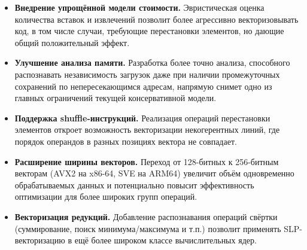 \begin{itemize}
    \item \textbf{Внедрение упрощённой модели стоимости.}
    Эвристическая оценка количества вставок и извлечений позволит более агрессивно векторизовывать код, 
    в том числе случаи, требующие перестановки элементов, но дающие общий положительный эффект.

    \item \textbf{Улучшение анализа памяти.}
    Разработка более точно анализа, способного распознавать независимость загрузок 
    даже при наличии промежуточных сохранений по непересекающимся адресам, 
    напрямую снимет одно из главных ограничений текущей консервативной модели.

    \item \textbf{Поддержка shuffle-инструкций.}
    Реализация операций перестановки элементов откроет возможность векторизации некогерентных линий, 
    где порядок операндов в разных позициях вектора не совпадает.

    \item \textbf{Расширение ширины векторов.}
    Переход от 128-битных к 256-битным векторам (AVX2 на x86-64, SVE на ARM64) увеличит
    объём одновременно обрабатываемых данных и потенциально повысит эффективность оптимизации для более широких групп операций.

    \item \textbf{Векторизация редукций.}
    Добавление распознавания операций свёртки (суммирование, поиск минимума/максимума и т.п.) 
    позволит применять SLP-векторизацию в ещё более широком классе вычислительных ядер.
\end{itemize}